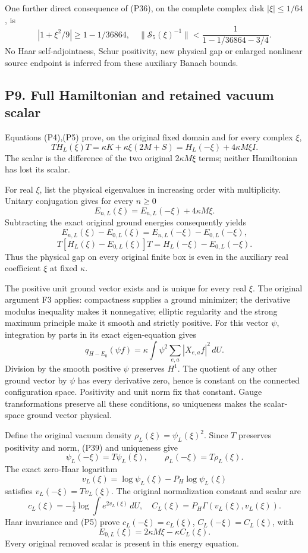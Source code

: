 \documentclass[11pt]{article}
\begin{document}
One further direct consequence of (P36), on the complete complex disk \(|\xi|\le1/64\), is
\[
 |1+\xi^2/9|\ge1-1/36864,\quad
 \|\mathscr S_5(\xi)^{-1}\|<
 \frac1{1-1/36864-3/4}.
\]
No Haar self-adjointness, Schur positivity, new physical gap or enlarged nonlinear source endpoint is inferred from these auxiliary Banach bounds.

\subsection*{P9. Full Hamiltonian and retained vacuum scalar}

Equations (P4),(P5) prove, on the original fixed domain and for every complex \(\xi\),
\[
 \boxed{TH_L(\xi)T
 =\kappa K+\kappa\xi(2M+S)
 =H_L(-\xi)+4\kappa M\xi I.} \tag{P39}
\]
The scalar is the difference of the two original \(2\kappa M\xi\) terms; neither Hamiltonian has lost its scalar.

For real \(\xi\), list the physical eigenvalues in increasing order with multiplicity. Unitary conjugation gives for every \(n\ge0\)
\[
 \boxed{E_{n,L}(\xi)=E_{n,L}(-\xi)+4\kappa M\xi.} \tag{P40}
\]
Subtracting the exact original ground energies consequently yields
\[
 E_{n,L}(\xi)-E_{0,L}(\xi)
 =E_{n,L}(-\xi)-E_{0,L}(-\xi),
\]
\[
 T[H_L(\xi)-E_{0,L}(\xi)]T=H_L(-\xi)-E_{0,L}(-\xi). \tag{P41}
\]
Thus the physical gap on every original finite box is even in the auxiliary real coefficient \(\xi\) at fixed \(\kappa\).

The positive unit ground vector exists and is unique for every real \(\xi\). The original argument F3 applies: compactness supplies a ground minimizer; the derivative modulus inequality makes it nonnegative; elliptic regularity and the strong maximum principle make it smooth and strictly positive. For this vector \(\psi\), integration by parts in its exact eigen-equation gives
\[
 q_{H-E_0}(\psi f)=
 \kappa\int\psi^2\sum_{e,a}|X_{e,a}f|^2\,dU.
\]
Division by the smooth positive \(\psi\) preserves \(H^1\). The quotient of any other ground vector by \(\psi\) has every derivative zero, hence is constant on the connected configuration space. Positivity and unit norm fix that constant. Gauge transformations preserve all these conditions, so uniqueness makes the scalar-space ground vector physical.

Define the original vacuum density \(\rho_L(\xi)=\psi_L(\xi)^2\). Since \(T\) preserves positivity and norm, (P39) and uniqueness give
\[
 \psi_L(-\xi)=T\psi_L(\xi),\qquad
 \rho_L(-\xi)=T\rho_L(\xi). \tag{P42}
\]
The exact zero-Haar logarithm
\[
 v_L(\xi)=\log\psi_L(\xi)-P_H\log\psi_L(\xi)
\]
satisfies \(v_L(-\xi)=Tv_L(\xi)\). The original normalization constant and scalar are
\[
 c_L(\xi)=-\tfrac12\log\int e^{2v_L(\xi)}\,dU,\quad
 C_L(\xi)=P_H\Gamma(v_L(\xi),v_L(\xi)).
\]
Haar invariance and (P5) prove \(c_L(-\xi)=c_L(\xi)\), \(C_L(-\xi)=C_L(\xi)\), with
\[
 E_{0,L}(\xi)=2\kappa M\xi-\kappa C_L(\xi). \tag{P43}
\]
Every original removed scalar is present in this energy equation.
\end{document}
